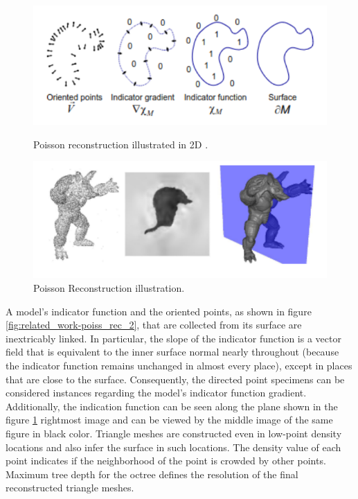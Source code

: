 \begin{figure}[htbp]
    \centering
    \begin{minipage}[b]{0.45\textwidth}
    \centering
    \includegraphics[width=1\linewidth]{97_graphics/related_work/poisson_reconstruction_2.pdf}
    \caption{Poisson reconstruction illustrated in 2D \parencite{kazhdan2006poisson}.}
    \label{fig:related_work-poiss_rec_2}
    \end{minipage}
    \hfill
    \begin{minipage}[b]{0.45\textwidth}
    \centering
    \includegraphics[width=1\linewidth]{97_graphics/related_work/poisson_reconstruction_1.pdf}
    \caption{Poisson Reconstruction illustration.\parencite{kazhdan2006poisson}}
    \label{fig:related_work-poiss_rec_1}
    \end{minipage}
\end{figure}

A model's indicator function and the oriented points, as shown in figure \ref{fig:related_work-poiss_rec_2}, that are collected from its surface are inextricably linked. In particular, the slope of the indicator function is a vector field that is equivalent to the inner surface normal nearly throughout (because the indicator function remains unchanged in almost every place), except in places that are close to the surface. Consequently, the directed point specimens can be considered instances regarding the model's indicator function gradient. Additionally, the indication function can be seen along the plane shown in the figure \ref{fig:related_work-poiss_rec_1} rightmost image and can be viewed by the middle image of the same figure in black color. Triangle meshes are constructed even in low-point density locations and also infer the surface in such locations. The density value of each point indicates if the neighborhood of the point is crowded by other points. Maximum tree depth for the octree defines the resolution of the final reconstructed triangle meshes.

